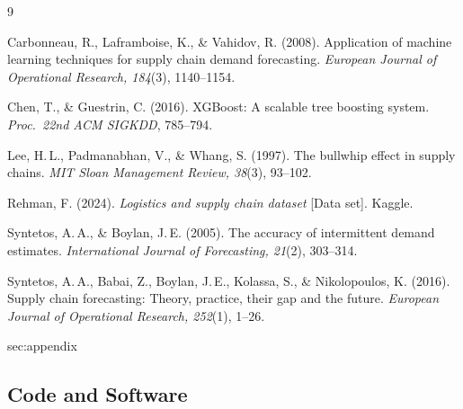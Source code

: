 \documentclass[11pt,letterpaper]{article}
\begin{document}
\begingroup
\renewcommand{\section}[2]{}
\begin{thebibliography}{9}

Carbonneau, R., Laframboise, K., \& Vahidov, R. (2008).
Application of machine learning techniques for supply chain demand forecasting.
\textit{European Journal of Operational Research, 184}(3), 1140--1154.

Chen, T., \& Guestrin, C. (2016).
XGBoost: A scalable tree boosting system.
\textit{Proc.\ 22nd ACM SIGKDD}, 785--794.

Lee, H.\,L., Padmanabhan, V., \& Whang, S. (1997).
The bullwhip effect in supply chains.
\textit{MIT Sloan Management Review, 38}(3), 93--102.

Rehman, F. (2024).
\textit{Logistics and supply chain dataset} [Data set]. Kaggle.

Syntetos, A.\,A., \& Boylan, J.\,E. (2005).
The accuracy of intermittent demand estimates.
\textit{International Journal of Forecasting, 21}(2), 303--314.

Syntetos, A.\,A., Babai, Z., Boylan, J.\,E., Kolassa, S., \& Nikolopoulos, K. (2016).
Supply chain forecasting: Theory, practice, their gap and the future.
\textit{European Journal of Operational Research, 252}(1), 1--26.

\end{thebibliography}
\endgroup


\newpage
\appendix
\section{Appendix: Code, Figures, and Supporting Tables}
\label{sec:appendix}

\subsection*{Code and Software}
\label{sec:code}
\end{document}
